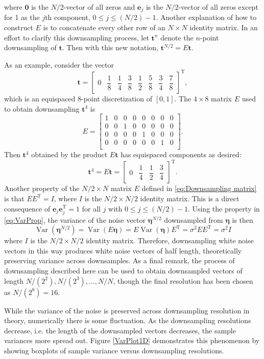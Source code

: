 \documentclass[12pt,notitlepage]{report}
\newcommand{\tVec}{\mathbf{t}}	%
\newcommand{\trans}{\mathrm{T}}	%
\newcommand{\noise}{\eta}	%
\newcommand{\noiseSD}{\sigma}	%
\newcommand{\noiseVec}{\bm{\noise}}	%
\DeclareMathOperator{\Var}{Var}	%
\begin{document}
where $\mathbf{0}$ is the $N/2$-vector of all zeros and $\mathbf{e}_j$ is the $N/2$-vector of all zeros except for 1 as the $j\text{th}$ component, $0 \leq j \leq (N/2)-1$. Another explanation of how to construct $E$ is to concatenate every other row of an $N \times N$ identity matrix. In an effort to clarify this downsampling process, let $\tVec^{n}$ denote the $n$-point downsampling of $\tVec$. Then with this new notation, $\tVec^{N/2} = E\tVec$. \par
As an example, consider the vector
\[\tVec = \begin{bmatrix}
0 & \dfrac{1}{8} & \dfrac{1}{4} & \dfrac{3}{8} & \dfrac{1}{2} & \dfrac{5}{8} & \dfrac{3}{4} & \dfrac{7}{8}
\end{bmatrix}^{\trans},\]
which is an equispaced 8-point discretization of $[0,1]$. The $4 \times 8$ matrix $E$ used to obtain downsampling $\tVec^{4}$ is
\[E = \begin{bmatrix}
1 & 0 & 0 & 0 & 0 & 0 & 0 & 0 \\
0 & 0 & 1 & 0 & 0 & 0 & 0 & 0 \\
0 & 0 & 0 & 0 & 1 & 0 & 0 & 0 \\
0 & 0 & 0 & 0 & 0 & 0 & 1 & 0 \\
\end{bmatrix}.\]
Then $\tVec^4$ obtained by the product $E\tVec$ has equispaced components as desired:
\[\tVec^4 = E\tVec = \begin{bmatrix}
0 & \dfrac{1}{4} & \dfrac{1}{2} & \dfrac{3}{4}
\end{bmatrix}^{\trans}.\]
\indent Another property of the $N/2 \times N$ matrix $E$ defined in \eqref{eq:Downsampling matrix} is that $EE^{\trans} = I$, where $I$ is the $N/2 \times N/2$ identity matrix.  This is a direct consequence of $\mathbf{e}_j\mathbf{e}_j^\trans = 1$ for all $j$ with $0 \leq j \leq (N/2)-1$. Using the property in \eqref{eq:VarProp}, the variance of the  noise vector $\noiseVec^{N/2}$ downsampled from $\noiseVec$ is then
\[\Var(\noiseVec^{N/2}) = \Var(E\noiseVec) = E\Var(\noiseVec)E^{\trans} = \noiseSD^2EE^{\trans} = \noiseSD^2I\]
where $I$ is the $N/2 \times N/2$ identity matrix. Therefore, downsampling white noise vectors in this way produces white noise vectors of half length, theoretically preserving variance across downsamples. As a final remark, the process of downsampling described here can be used to obtain downsampled vectors of length $N/(2^2), N/(2^3), \ldots, N/N$, though the final resolution has been chosen as $N/(2^8) = 16$. \par
While the variance of the noise is preserved across downsampling resolution in theory, numerically there is some fluctuation. As the downsampling resolutions decrease, i.e. the length of the downsampled vectors decreases, the sample variances more spread out. Figure \ref{VarPlot1D} demonstrates this phenomenon by showing boxplots of sample variance versus downsampling resolutions. %
\end{document}
